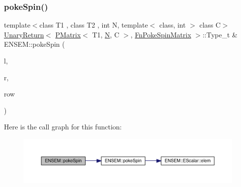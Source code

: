 \subsubsection{\texorpdfstring{pokeSpin()}{pokeSpin()}\hspace{0.1cm}{\footnotesize\ttfamily [1/2]}}
{\footnotesize\ttfamily template$<$class T1 , class T2 , int N, template$<$ class, int $>$ class C$>$ \\
\mbox{\hyperlink{structENSEM_1_1UnaryReturn}{Unary\+Return}}$<$ \mbox{\hyperlink{classENSEM_1_1PMatrix}{P\+Matrix}}$<$ T1, \mbox{\hyperlink{operator__name__util_8cc_a7722c8ecbb62d99aee7ce68b1752f337}{N}}, C $>$, \mbox{\hyperlink{structENSEM_1_1FnPokeSpinMatrix}{Fn\+Poke\+Spin\+Matrix}} $>$\+::Type\+\_\+t \& E\+N\+S\+E\+M\+::poke\+Spin (\begin{DoxyParamCaption}\item[{\mbox{\hyperlink{classENSEM_1_1PMatrix}{P\+Matrix}}$<$ T1, \mbox{\hyperlink{operator__name__util_8cc_a7722c8ecbb62d99aee7ce68b1752f337}{N}}, C $>$ \&}]{l,  }\item[{const \mbox{\hyperlink{classENSEM_1_1PMatrix}{P\+Matrix}}$<$ T2, \mbox{\hyperlink{operator__name__util_8cc_a7722c8ecbb62d99aee7ce68b1752f337}{N}}, C $>$ \&}]{r,  }\item[{int}]{row }\end{DoxyParamCaption})\hspace{0.3cm}{\ttfamily [inline]}}

Here is the call graph for this function\+:\nopagebreak
\begin{figure}[H]
\begin{center}
\leavevmode
\includegraphics[width=350pt]{df/d0a/group__primmatrix_ga738f0f1d3bad8770111452c72714a4ae_cgraph}
\end{center}
\end{figure}
\mbox{\label{group__primmatrix_gaf6f04aa80d2490f962a3132eb16fa98a}} 
